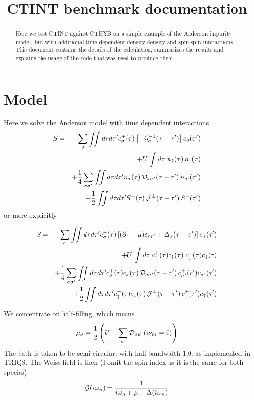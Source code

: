\documentclass[a4paper,10pt]{article}
\title{CTINT benchmark documentation}
\newcommand{\up}{\uparrow}
\newcommand{\dn}{\downarrow}
\begin{document}
\maketitle

\begin{abstract}
Here we test CTINT against CTHYB on a simple example of the Anderson impurity model, but with additional time dependent density-density and spin-spin interactions. This document contains the details of the calculation, summarizes the results and explains the usage of the code that was used to produce them.
\end{abstract}

\section{Model}

Here we solve the Anderson model with time dependent interactions
\begin{eqnarray}
 S &=& \sum_\sigma \iint d\tau d\tau' c^+_\sigma(\tau)\left[ -{\cal G}_\sigma^{-1}(\tau-\tau')\right] c_\sigma(\tau')\\
   &&  + U \,\int d\tau\; n_\up(\tau) \, n_\dn(\tau) \\
   &&  + \frac{1}{4}\sum_{\sigma\sigma'} \iint d\tau d\tau' n_\sigma(\tau) \,{\cal D}_{\sigma\sigma'}(\tau-\tau')  \, n_{\sigma'}(\tau') \\
   &&  + \frac{1}{2}\iint d\tau d\tau' S^+(\tau) \,{\cal J}^\perp(\tau-\tau')  \, S^-(\tau')
\end{eqnarray}
or more explicitly

\begin{eqnarray}
 S &=& \sum_\sigma \iint d\tau d\tau' c^+_\sigma(\tau)\left[ (\partial_\tau - \mu)\delta_{\tau\tau'} + \Delta_\sigma(\tau-\tau')\right] c_\sigma(\tau')\\
   &&  + U \,\int d\tau\; c^+_\up(\tau) c_\up(\tau) \; c^+_\dn(\tau) c_\dn(\tau) \\
   &&  + \frac{1}{4}\sum_{\sigma\sigma'} \iint d\tau d\tau' c^+_\sigma(\tau) c_\sigma(\tau) \,{\cal D}_{\sigma\sigma'}(\tau-\tau')  \, c^+_{\sigma'}(\tau') c_{\sigma'}(\tau') \\
   &&  + \frac{1}{2}\iint d\tau d\tau' c^+_\up(\tau) c_\dn(\tau) \,{\cal J}^\perp(\tau-\tau')  \, c^+_\dn(\tau') c_\up(\tau')
\end{eqnarray}

We concentrate on half-filling, which means
\begin{equation}
 \mu_\sigma = \frac{1}{2}\left( U + \sum_{\sigma'} {\cal D}_{\sigma\sigma'}(i\nu_m=0) \right)
\end{equation}
The bath is taken to be semi-circular, with half-bandwidth $1.0$, as implemented in TRIQS. The Weiss field is then (I omit the spin index as it is the same for both species)
\begin{equation}
 {\cal G}(i\omega_n) = \frac{1}{i\omega_n+\mu - \Delta(i\omega_n)}
\end{equation}
\end{document}

